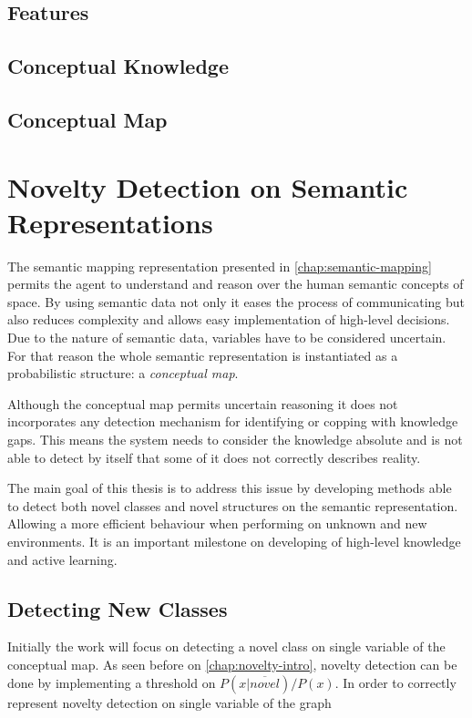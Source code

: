 \section{Features}
\section{Conceptual Knowledge}
\section{Conceptual Map}



\chapter{Novelty Detection on Semantic Representations}\label{chap:novelty}
The semantic mapping representation presented in \autoref{chap:semantic-mapping}
permits the agent to understand and reason over the human semantic concepts of
space. By using semantic data not only it eases the process of communicating 
but also reduces complexity and allows easy implementation of high-level
decisions.
Due to the nature of semantic data, variables have to be considered
uncertain. For that reason the whole semantic representation is instantiated
as a probabilistic structure: a \emph{conceptual map}. 

Although the conceptual map permits uncertain reasoning it does not incorporates
any detection mechanism for identifying or copping with knowledge gaps.
This means the system needs to consider the knowledge absolute and is not
able to detect by itself that some of it does not correctly describes reality. 

The main goal of this thesis is to address this issue by developing methods
able to detect both novel classes and novel structures on the semantic
representation. Allowing a more efficient behaviour when performing on unknown
and new environments. It is an important milestone on developing of high-level
knowledge and active learning.


\section{Detecting New Classes}
Initially the work will focus on detecting a novel class on single variable of
the conceptual map.
As seen before on \autoref{chap:novelty-intro}, novelty detection can be
done by implementing a threshold on $P(x|\overline{novel})/P(x)$.
In order to correctly represent novelty detection on single variable of the
graph

